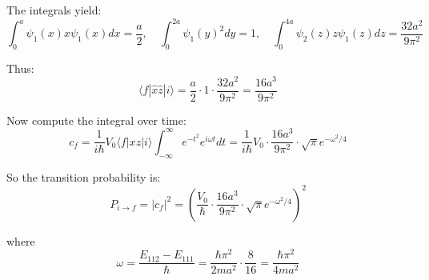 \documentclass[12pt]{article}
\begin{document}
        The integrals yield:
        \[
            \int_0^a \psi_1(x) x \psi_1(x) dx = \frac{a}{2},\quad
            \int_0^{2a} \psi_1(y)^2 dy = 1,\quad
            \int_0^{4a} \psi_2(z) z \psi_1(z) dz = \frac{32 a^2}{9\pi^2}
        \]
        
        Thus:
        \[
            \langle f | \hat{x} \hat{z} | i \rangle = \frac{a}{2} \cdot 1 \cdot \frac{32 a^2}{9\pi^2} = \frac{16 a^3}{9\pi^2}
        \]
        
        Now compute the integral over time:
        \[
            c_f = \frac{1}{i\hbar} V_0 \langle f | xz | i \rangle \int_{-\infty}^{\infty} e^{-t^2} e^{i\omega t} dt = \frac{1}{i\hbar} V_0 \cdot \frac{16 a^3}{9\pi^2} \cdot \sqrt{\pi} e^{-\omega^2/4}
        \]
        
        So the transition probability is:
        \[
            P_{i \to f} = |c_f|^2 = \left( \frac{V_0}{\hbar} \cdot \frac{16 a^3}{9\pi^2} \cdot \sqrt{\pi} e^{-\omega^2/4} \right)^2
        \]
        
        where
        \[
            \omega = \frac{E_{112} - E_{111}}{\hbar} = \frac{\hbar \pi^2}{2ma^2} \cdot \frac{8}{16} = \frac{\hbar \pi^2}{4ma^2}
        \]

    
\end{document}
